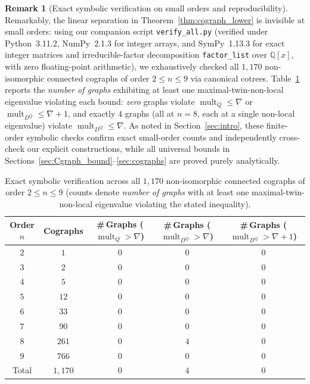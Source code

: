 \documentclass[11pt,a4paper]{article}
\theoremstyle{definition}
\newtheorem{remark}[theorem]{Remark}
\DeclareMathOperator{\mult}{mult}
\begin{document}
\begin{remark}[Exact symbolic verification on small orders and reproducibility]\label{rem:enum}
  Remarkably, the linear separation in Theorem~\ref{thm:cograph_lower} is invisible at small orders: using our companion script \texttt{verify\_all.py} (verified under Python~3.11.2, NumPy~2.1.3 for integer arrays, and SymPy~1.13.3 for exact integer matrices and irreducible-factor decomposition \texttt{factor\_list} over $\mathbb{Q}[x]$, with zero floating-point arithmetic), we exhaustively checked all $1{,}170$ non-isomorphic connected cographs of order $2 \le n \le 9$ via canonical cotrees. Table~\ref{tab:cographs} reports the \emph{number of graphs} exhibiting at least one maximal-twin-non-local eigenvalue violating each bound: \emph{zero} graphs violate $\mult_Q \le \nabla$ or $\mult_{D^Q} \le \nabla + 1$, and exactly $4$ graphs (all at $n = 8$, each at a single non-local eigenvalue) violate $\mult_{D^Q} \le \nabla$. As noted in Section~\ref{sec:intro}, these finite-order symbolic checks confirm exact small-order counts and independently cross-check our explicit constructions, while all universal bounds in Sections~\ref{sec:Cgraph_bound}--\ref{sec:cographs} are proved purely analytically.
\end{remark}

\begin{table}[!htbp]
  \centering
  \caption{Exact symbolic verification across all $1{,}170$ non-isomorphic connected cographs of order $2 \le n \le 9$ (counts denote \emph{number of graphs} with at least one maximal-twin-non-local eigenvalue violating the stated inequality).}
  \label{tab:cographs}
  {\small\setlength{\tabcolsep}{5pt}
  \begin{tabular}{ccccc}
    \toprule
    Order $n$ & Cographs & \#\,Graphs ($\mult_{Q} > \nabla$) & \#\,Graphs ($\mult_{D^Q} > \nabla$) & \#\,Graphs ($\mult_{D^Q} > \nabla + 1$) \\
    \midrule
    $2$ & $1$   & $0$ & $0$ & $0$ \\
    $3$ & $2$   & $0$ & $0$ & $0$ \\
    $4$ & $5$   & $0$ & $0$ & $0$ \\
    $5$ & $12$  & $0$ & $0$ & $0$ \\
    $6$ & $33$  & $0$ & $0$ & $0$ \\
    $7$ & $90$  & $0$ & $0$ & $0$ \\
    $8$ & $261$ & $0$ & $4$ & $0$ \\
    $9$ & $766$ & $0$ & $0$ & $0$ \\
    \midrule
    Total & $1{,}170$ & $0$ & $4$ & $0$ \\
    \bottomrule
  \end{tabular}}
\end{table}
\end{document}

